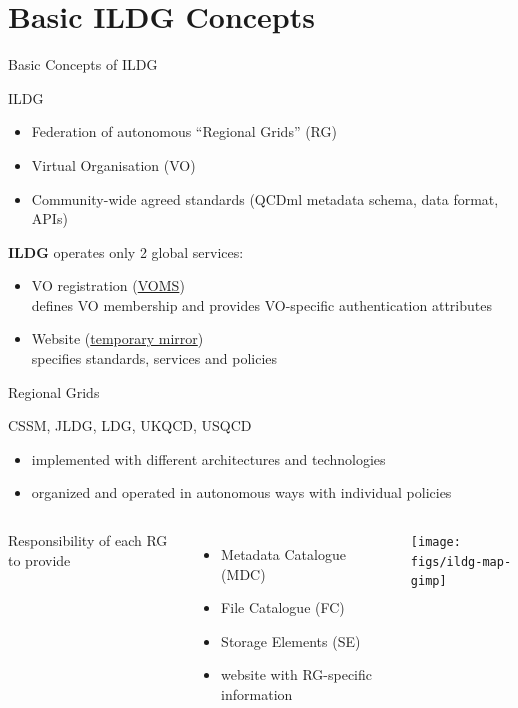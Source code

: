 \documentclass[aspectratio=169,xcolor=dvipsnames]{beamer}
\def\figs{figs1}
\begin{document}
\section{Basic ILDG Concepts}
\begin{frame}{Basic Concepts of ILDG}
  \begin{block}{ILDG}
    \begin{itemize}
    \item Federation of \alert{autonomous} ``Regional Grids'' (RG)
    \item Virtual Organisation (VO)
    \item Community-wide agreed standards (QCDml metadata schema, data format, APIs) 
    \end{itemize}
  \end{block}

  \vspace*{5mm}
  {\bf ILDG} operates only \alert{2 global services:}
  \begin{itemize}
  \item VO registration (\href{https://grid-voms.desy.de:8443/voms/ildg}{VOMS}) \\[1mm]
      {\small
        defines VO membership and provides VO-specific authentication attributes
      }
    \item Website (\href{https://hpc.desy.de/ildg}{temporary mirror})\\[1mm]
      {\small 
        specifies standards, services and policies
      }
    \end{itemize}

\end{frame}
\begin{frame}{Regional Grids}

  \vspace*{3mm}
  \begin{block}{CSSM, JLDG, LDG, UKQCD, USQCD}
    \begin{itemize}
    \item implemented with different architectures and technologies
    \item organized and operated in autonomous ways with individual policies
    \end{itemize}
  \end{block}

  \begin{columns}
    Responsibility of \alert{each RG} to provide
    \begin{itemize}
    \item Metadata Catalogue (MDC)
    \item File Catalogue (FC)
    \item Storage Elements (SE)
    \item website with RG-specific information
    \end{itemize}

    \texttt{[image: \\figs/ildg-map-gimp]}
  \end{columns}
\end{frame}
\end{document}
